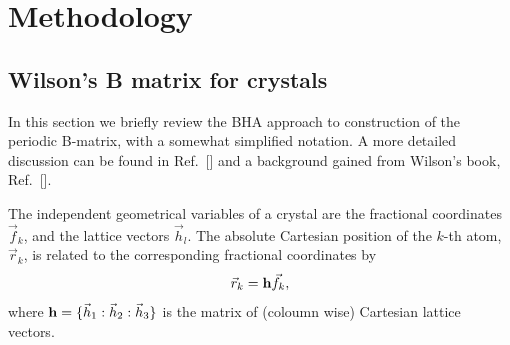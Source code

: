 \twolinestyle{\documentclass[prb,preprint]{revtex4}}
\begin{document}
\section{Methodology}

\subsection{Wilson's B matrix for crystals} \label{crystalBmat}

In this section we briefly review the BHA approach to construction
of the periodic B-matrix, with a somewhat simplified notation.  
A more detailed discussion can be found in Ref.~[] 
and a background gained from Wilson's book, Ref.~[].

The independent geometrical variables of a crystal are the 
fractional coordinates $\vec{f}_{k}$, and the lattice vectors $\vec{h}_{l}$.
The absolute Cartesian position of the $k$-th atom, $\vec{r}_{k}$, 
is related to the corresponding fractional coordinates by
\begin{equation}
\vec{r}_{k} = {\bf h} \vec{f}_{k} ,
\end{equation}
where ${\bf h}=\{\vec{h}_1:\vec{h}_2:\vec{h}_3\}$ is the matrix of (coloumn wise) Cartesian lattice vectors.
\end{document}
